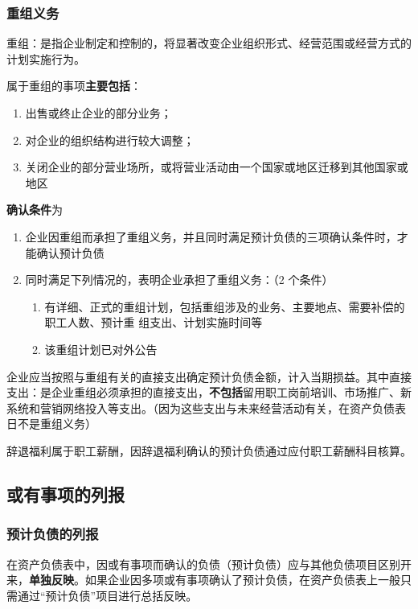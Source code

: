 \documentclass[UTF8,12pt]{ctexart}
\numberwithin{equation}{section} %
\numberwithin{figure}{section}
\numberwithin{table}{section}
\begin{document}
	\subsubsection{重组义务}
	重组：是指企业制定和控制的，将显著改变企业组织形式、经营范围或经营方式的计划实施行为。
	
	属于重组的事项\textbf{主要包括}：
	\begin{enumerate}
		\item 出售或终止企业的部分业务；
		
		\item 对企业的组织结构进行较大调整；
		
		\item 关闭企业的部分营业场所，或将营业活动由一个国家或地区迁移到其他国家或地区
	\end{enumerate}
	
	
	\textbf{确认条件}为
	\begin{enumerate}
		\item 企业因重组而承担了重组义务，并且同时满足预计负债的三项确认条件时，才能确认预计负债
		
		\item 同时满足下列情况的，表明企业承担了重组义务：（2 个条件）
		\begin{enumerate}
			\item 有详细、正式的重组计划，包括重组涉及的业务、主要地点、需要补偿的职工人数、预计重   组支出、计划实施时间等
			
			\item 该重组计划已对外公告
		\end{enumerate}
		
	\end{enumerate}

	企业应当按照与重组有关的直接支出确定预计负债金额，计入当期损益。其中直接支出：是企业重组必须承担的直接支出，\textbf{不包括}留用职工岗前培训、市场推广、新系统和营销网络投入等支出。（因为这些支出与未来经营活动有关，在资产负债表日不是重组义务）
	
	辞退福利属于职工薪酬，因辞退福利确认的预计负债通过应付职工薪酬科目核算。
	
	
	\subsection{或有事项的列报}
	\subsubsection{预计负债的列报}
	在资产负债表中，因或有事项而确认的负债（预计负债）应与其他负债项目区别开来，\textbf{单独反映}。如果企业因多项或有事项确认了预计负债，在资产负债表上一般只需通过“预计负债”项目进行总括反映。
	
\end{document}
